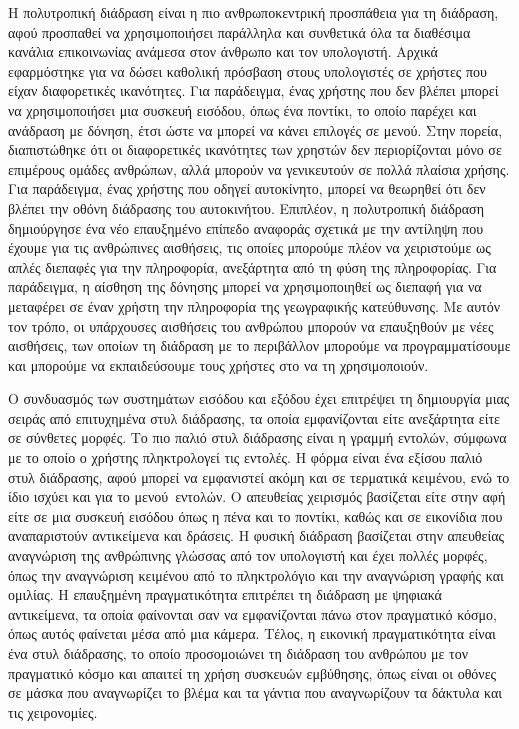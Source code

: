 \documentclass[
]{article}
\begin{document}
Η πολυτροπική διάδραση είναι η πιο ανθρωποκεντρική προσπάθεια για τη
διάδραση, αφού προσπαθεί να χρησιμοποιήσει παράλληλα και συνθετικά όλα
τα διαθέσιμα κανάλια επικοινωνίας ανάμεσα στον άνθρωπο και τον
υπολογιστή. Αρχικά εφαρμόστηκε για να δώσει καθολική πρόσβαση στους
υπολογιστές σε χρήστες που είχαν διαφορετικές ικανότητες. Για
παράδειγμα, ένας χρήστης που δεν βλέπει μπορεί να χρησιμοποιήσει μια
συσκευή εισόδου, όπως ένα ποντίκι, το οποίο παρέχει και ανάδραση με
δόνηση, έτσι ώστε να μπορεί να κάνει επιλογές σε μενού. Στην πορεία,
διαπιστώθηκε ότι οι διαφορετικές ικανότητες των χρηστών δεν
περιορίζονται μόνο σε επιμέρους ομάδες ανθρώπων, αλλά μπορούν να
γενικευτούν σε πολλά πλαίσια χρήσης. Για παράδειγμα, ένας χρήστης που
οδηγεί αυτοκίνητο, μπορεί να θεωρηθεί ότι δεν βλέπει την οθόνη διάδρασης
του αυτοκινήτου. Επιπλέον, η πολυτροπική διάδραση δημιούργησε ένα νέο
επαυξημένο επίπεδο αναφοράς σχετικά με την αντίληψη που έχουμε για τις
ανθρώπινες αισθήσεις, τις οποίες μπορούμε πλέον να χειριστούμε ως απλές
διεπαφές για την πληροφορία, ανεξάρτητα από τη φύση της πληροφορίας. Για
παράδειγμα, η αίσθηση της δόνησης μπορεί να χρησιμοποιηθεί ως διεπαφή
για να μεταφέρει σε έναν χρήστη την πληροφορία της γεωγραφικής
κατεύθυνσης. Με αυτόν τον τρόπο, οι υπάρχουσες αισθήσεις του ανθρώπου
μπορούν να επαυξηθούν με νέες αισθήσεις, των οποίων τη διάδραση με το
περιβάλλον μπορούμε να προγραμματίσουμε και μπορούμε να εκπαιδεύσουμε
τους χρήστες στο να τη χρησιμοποιούν.

Ο συνδυασμός των συστημάτων εισόδου και εξόδου έχει επιτρέψει τη
δημιουργία μιας σειράς από επιτυχημένα στυλ διάδρασης, τα οποία
εμφανίζονται είτε ανεξάρτητα είτε σε σύνθετες μορφές. Το πιο παλιό στυλ
διάδρασης είναι η γραμμή εντολών, σύμφωνα με το οποίο ο χρήστης
πληκτρολογεί τις εντολές. Η φόρμα είναι ένα εξίσου παλιό στυλ διάδρασης,
αφού μπορεί να εμφανιστεί ακόμη και σε τερματικά κειμένου, ενώ το ίδιο
ισχύει και για το μενού~εντολών. Ο απευθείας χειρισμός βασίζεται είτε
στην αφή είτε σε μια συσκευή εισόδου όπως η πένα και το ποντίκι, καθώς
και σε εικονίδια που αναπαριστούν αντικείμενα και δράσεις. Η φυσική
διάδραση βασίζεται στην απευθείας αναγνώριση της ανθρώπινης γλώσσας από
τον υπολογιστή και έχει πολλές μορφές, όπως την αναγνώριση κειμένου από
το πληκτρολόγιο και την αναγνώριση γραφής και ομιλίας. Η επαυξημένη
πραγματικότητα επιτρέπει τη διάδραση με ψηφιακά αντικείμενα, τα οποία
φαίνονται σαν να εμφανίζονται πάνω στον πραγματικό κόσμο, όπως αυτός
φαίνεται μέσα από μια κάμερα. Τέλος, η εικονική πραγματικότητα είναι ένα
στυλ διάδρασης, το οποίο προσομοιώνει τη διάδραση του ανθρώπου με τον
πραγματικό κόσμο και απαιτεί τη χρήση συσκευών εμβύθησης, όπως είναι οι
οθόνες σε μάσκα που αναγνωρίζει το βλέμα και τα γάντια που αναγνωρίζουν
τα δάκτυλα και τις χειρονομίες.
\end{document}
